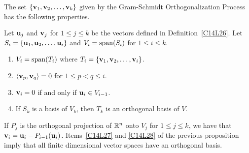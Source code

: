 The set $\{\mathbf{v}_1, \mathbf{v}_2, \ldots , \mathbf{v}_k\}$ given by the
Gram-Schmidt Orthogonalization Process has the following properties.

\begin{prop}
Let $\mathbf{u}_j$ and $\mathbf{v}_j$ for $1\leq j\leq k$ be the vectors
defined in Definition~\ref{C14L26}.  Let 
$S_i = \{\mathbf{u}_1, \mathbf{u}_2, \ldots , \mathbf{u}_i\}$
and $V_i = \operatorname{span}(S_i)$ for $1\leq i \leq k$.
\begin{enumerate}
\item $V_i = \operatorname{span}(T_i)$ where
$T_i = \{\mathbf{v}_1, \mathbf{v}_2, \ldots , \mathbf{v}_i\}$.
\item $\left\langle{\mathbf{v}_p} , {\mathbf{v}_q}\right\rangle = 0$ for $1 \leq p < q \leq i$.
\label{C14L27}
\item $\mathbf{v}_i = 0$ if and only if $\mathbf{u}_i \in V_{i-1}$.
\item If $S_k$ is a basis of $V_k$, then $T_k$ is an orthogonal basis of
$V$. \label{C14L28}
\end{enumerate}
\end{prop}

\begin{rmk}
If $P_j$ is the orthogonal projection of $\mathbb{R}^n$ onto $V_j$ for
$1 \leq j \leq k$, we have that
$\mathbf{v}_i = \mathbf{u}_i - P_{i-1}(\mathbf{u}_i)$.
Items~\ref{C14L27} and \ref{C14L28} of the previous proposition
imply that all finite dimensional vector spaces have an orthogonal
basis.
\end{rmk}

